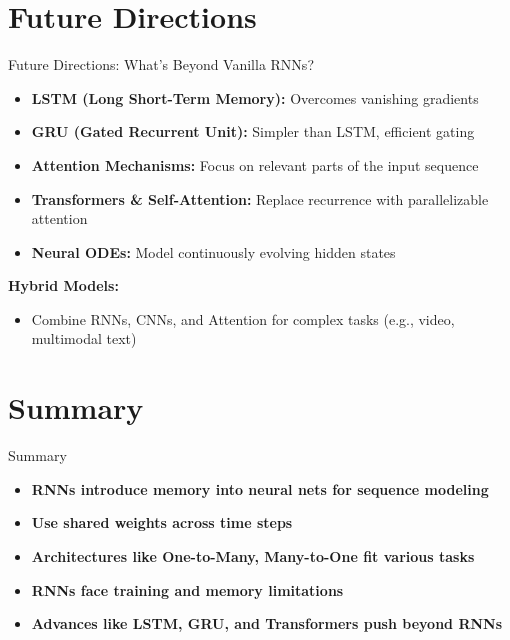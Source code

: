 \section{Future Directions}
\begin{frame}[allowframebreaks]{Future Directions: What's Beyond Vanilla RNNs?}
    \begin{itemize}
        \item \textbf{LSTM (Long Short-Term Memory):} Overcomes vanishing gradients
        \item \textbf{GRU (Gated Recurrent Unit):} Simpler than LSTM, efficient gating
        \item \textbf{Attention Mechanisms:} Focus on relevant parts of the input sequence
        \item \textbf{Transformers \& Self-Attention:} Replace recurrence with parallelizable attention
        \item \textbf{Neural ODEs:} Model continuously evolving hidden states
    \end{itemize}

\framebreak
    \textbf{Hybrid Models:}
    \begin{itemize}
        \item Combine RNNs, CNNs, and Attention for complex tasks (e.g., video, multimodal text)
    \end{itemize}
\end{frame}


\section{Summary}
\begin{frame}{Summary}
    \begin{itemize}
        \item \textbf{RNNs introduce memory into neural nets for sequence modeling}
        \item \textbf{Use shared weights across time steps}
        \item \textbf{Architectures like One-to-Many, Many-to-One fit various tasks}
        \item \textbf{RNNs face training and memory limitations}
        \item \textbf{Advances like LSTM, GRU, and Transformers push beyond RNNs}
    \end{itemize}
\end{frame}


